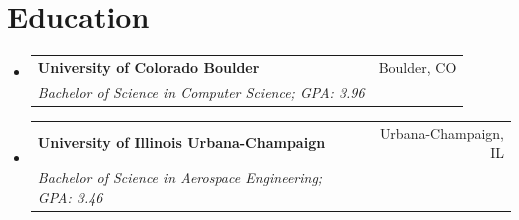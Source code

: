\documentclass[letterpaper,11pt]{article}
\makeatletter
\newcommand{\resumeSubheading}[4]{
  \vspace{-1pt}
\item
  \begin{tabular*}{0.97\textwidth}[t]{l@{\extracolsep{\fill}}r}
    \textbf{#1} & #2\vspace{-2pt} \\
    \textit{\small#3} & \textit{\small #4} \\
  \end{tabular*}\vspace{-8pt}
}
\newcommand{\resumeSubHeadingListStart}{
\begin{itemize}[leftmargin=*]}
\newcommand{\resumeSubHeadingListEnd}{
\end{itemize}}
\makeatother
\begin{document}
\section{Education}
\resumeSubHeadingListStart
\resumeSubheading
{University of Colorado Boulder}{Boulder, CO}
{Bachelor of Science in Computer Science;  GPA: 3.96}{}\vspace{-2pt}
\resumeSubheading
{University of Illinois Urbana-Champaign}{Urbana-Champaign, IL}
{Bachelor of Science in Aerospace Engineering;  GPA: 3.46}{}\vspace{-2pt}
\resumeSubHeadingListEnd
\end{document}
